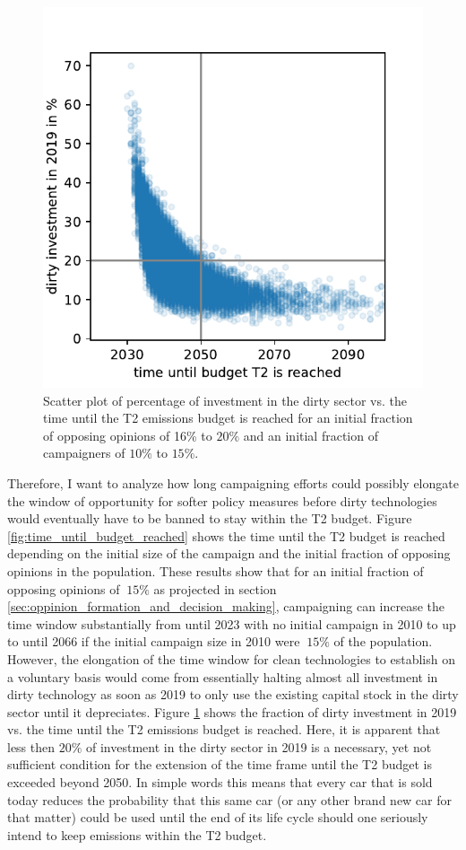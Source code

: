 \begin{figure}
	\vspace{-.4 cm}
        \hspace{-1.4 cm}
        \includegraphics[width = .57 \textwidth]{./figures/dirty_investment_consequences.pdf}
        \caption{Scatter plot of percentage of investment in the dirty sector vs. the time until the T2 emissions budget is reached for an initial fraction of opposing opinions of 16\% to $20\%$ and an initial fraction of campaigners of $10\%$ to $15\%$. \label{fig:dirty_investment_consequences}}
\end{figure}
Therefore, I want to analyze how long campaigning efforts could possibly elongate the window of opportunity for softer policy measures before dirty technologies would eventually have to be banned to stay within the T2 budget. Figure \ref{fig:time_until_budget_reached} shows the time until the T2 budget is reached depending on the initial size of the campaign and the initial fraction of opposing opinions in the population. These results show that for an initial fraction of opposing opinions of $~15\%$ as projected in section \ref{sec:oppinion_formation_and_decision_making}, campaigning can increase the time window substantially from until 2023 with no initial campaign in 2010 to up to until 2066 if the initial campaign size in 2010 were $~15\%$ of the population. However, the elongation of the time window for clean technologies to establish on a voluntary basis would come from essentially halting almost all investment in dirty technology as soon as 2019 to only use the existing capital stock in the dirty sector until it depreciates. Figure \ref{fig:dirty_investment_consequences} shows the fraction of dirty investment in 2019 vs. the time until the T2 emissions budget is reached. Here, it is apparent that less then $20\%$ of investment in the dirty sector in 2019 is a necessary, yet not sufficient condition for the extension of the time frame until the T2 budget is exceeded beyond 2050. In simple words this means that every car that is sold today reduces the probability that this same car (or any other brand new car for that matter) could be used until the end of its life cycle should one seriously intend to keep emissions within the T2 budget.

